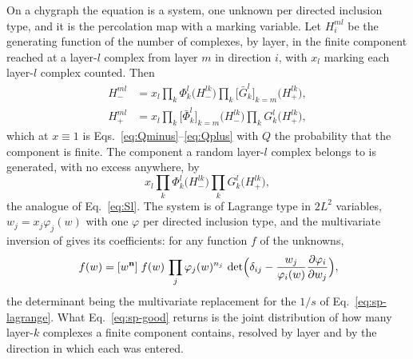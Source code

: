 On a chygraph the equation is a system, one unknown per directed inclusion
type, and it is the percolation map with a marking variable. Let $H^{ml}_{i}$
be the generating function of the number of complexes, by layer, in the
finite component reached at a layer-$l$ complex from layer $m$ in direction
$i$, with $x_{l}$ marking each layer-$l$ complex counted. Then
\begin{equation}
  \begin{aligned}
  H^{ml}_{-}&=x_{l}\prod_{k}\Phi^{l}_{k}\bigl(H^{lk}_{-}\bigr)
              \prod_{k}\bigl[\bar G^{l}_{k}\bigr]_{k=m}\bigl(H^{lk}_{+}\bigr),\\
  H^{ml}_{+}&=x_{l}\prod_{k}\bigl[\bar\Phi^{l}_{k}\bigr]_{k=m}\bigl(H^{lk}_{-}\bigr)
              \prod_{k}G^{l}_{k}\bigl(H^{lk}_{+}\bigr),
  \end{aligned}
  \label{eq:sp-system}
\end{equation}
which at $x\equiv1$ is Eqs.~\eqref{eq:Qminus}--\eqref{eq:Qplus} with $Q$ the
probability that the component is finite. The component a random layer-$l$
complex belongs to is generated, with no excess anywhere, by
\[
  x_{l}\prod_{k}\Phi^{l}_{k}\bigl(H^{lk}_{-}\bigr)
       \prod_{k}G^{l}_{k}\bigl(H^{lk}_{+}\bigr),
\]
the analogue of Eq.~\eqref{eq:Sl}. The system is of Lagrange type in
$2L^{2}$ variables, $w_{j}=x_{j}\varphi_{j}(w)$ with one $\varphi$ per
directed inclusion type, and the multivariate inversion of \citet{good1960}
gives its coefficients: for any function $f$ of the unknowns,
\begin{equation}
  [x^{\mathbf n}]\,f(w)
  =[w^{\mathbf n}]\;f(w)\,\prod_{j}\varphi_{j}(w)^{n_{j}}\,
   \det\Bigl(\delta_{ij}-\frac{w_{j}}{\varphi_{i}(w)}
             \frac{\partial\varphi_{i}}{\partial w_{j}}\Bigr),
  \label{eq:sp-good}
\end{equation}
the determinant being the multivariate replacement for the $1/s$ of
Eq.~\eqref{eq:sp-lagrange}. What Eq.~\eqref{eq:sp-good} returns is the joint
distribution of how many layer-$k$ complexes a finite component contains,
resolved by layer and by the direction in which each was entered.

